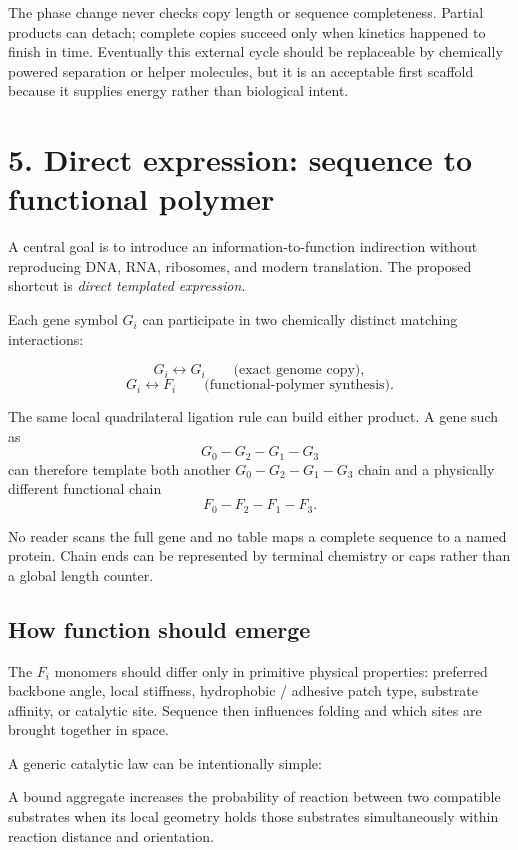 \documentclass[10pt,a4paper]{article}
\begin{document}
The phase change never checks copy length or sequence completeness. Partial products can detach; complete copies succeed only when kinetics happened to finish in time. Eventually this external cycle should be replaceable by chemically powered separation or helper molecules, but it is an acceptable first scaffold because it supplies energy rather than biological intent.

\section{5. Direct expression: sequence to functional polymer}

A central goal is to introduce an information-to-function indirection without reproducing DNA, RNA, ribosomes, and modern translation. The proposed shortcut is \emph{direct templated expression}.

Each gene symbol $G_i$ can participate in two chemically distinct matching interactions:

\[
G_i \leftrightarrow G_i \qquad \text{(exact genome copy)},
\]
\[
G_i \leftrightarrow F_i \qquad \text{(functional-polymer synthesis)}.
\]

The same local quadrilateral ligation rule can build either product. A gene such as
\[
G_0-G_2-G_1-G_3
\]
can therefore template both another $G_0-G_2-G_1-G_3$ chain and a physically different functional chain
\[
F_0-F_2-F_1-F_3.
\]

No reader scans the full gene and no table maps a complete sequence to a named protein. Chain ends can be represented by terminal chemistry or caps rather than a global length counter.

\subsection{How function should emerge}

The $F_i$ monomers should differ only in primitive physical properties: preferred backbone angle, local stiffness, hydrophobic / adhesive patch type, substrate affinity, or catalytic site. Sequence then influences folding and which sites are brought together in space.

A generic catalytic law can be intentionally simple:

\begin{principle}
A bound aggregate increases the probability of reaction between two compatible substrates when its local geometry holds those substrates simultaneously within reaction distance and orientation.
\end{principle}
\end{document}
